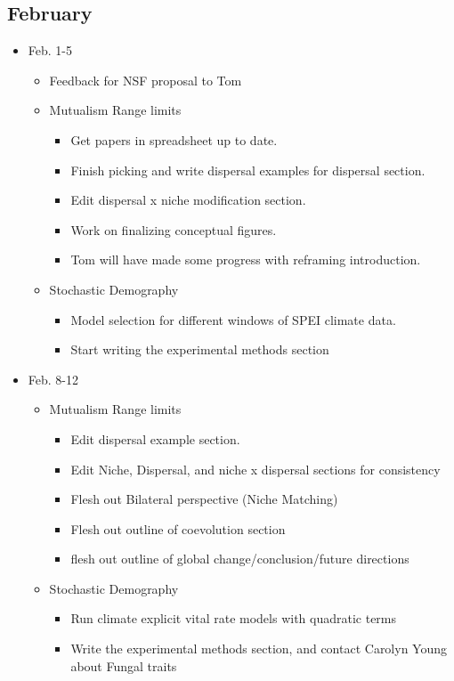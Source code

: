 \documentclass{article}
\begin{document}
\subsection*{February}
\begin{itemize}
\item{Feb. 1-5}
\begin{itemize}
\item{Feedback for NSF proposal to Tom}
\item{Mutualism Range limits}
     \begin{itemize}
        \item{Get papers in spreadsheet up to date.}
        \item{Finish picking and write dispersal examples for dispersal section.}
        \item{Edit dispersal x niche modification section.}
        \item{Work on finalizing conceptual figures.}
        \item{Tom will have made some progress with reframing introduction.}
     \end{itemize}
     
\item{Stochastic Demography}
     \begin{itemize}
        \item{Model selection for different windows of SPEI climate data.}
        \item{Start writing the experimental methods section}
     \end{itemize}
\end{itemize}

\item{Feb. 8-12}
\begin{itemize}
  \item{Mutualism Range limits}
     \begin{itemize}
         \item{Edit dispersal example section.}
         \item{Edit Niche, Dispersal, and niche x dispersal sections for consistency}
         \item{Flesh out Bilateral perspective (Niche Matching)}
         \item{Flesh out outline of coevolution section}
         \item{flesh out outline of global change/conclusion/future directions}
     \end{itemize}

  \item{Stochastic Demography}
     \begin{itemize}
        \item{Run climate explicit vital rate models with quadratic terms}
        \item{Write the experimental methods section, and contact Carolyn Young about Fungal traits}
     \end{itemize}


\end{itemize}
\end{itemize}
\end{document}
